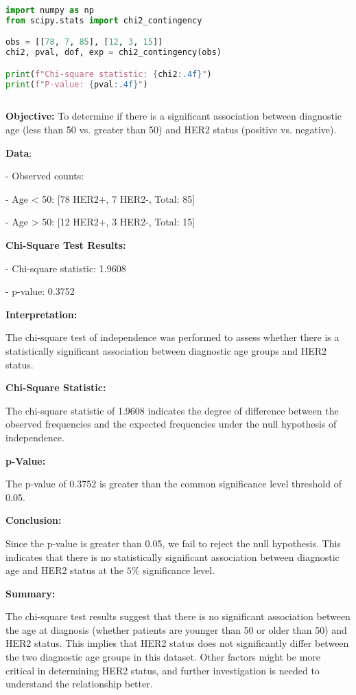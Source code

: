 \documentclass[12 px]{article}
\begin{document}
\begin{lstlisting}[language=Python, breaklines=true]
import numpy as np
from scipy.stats import chi2_contingency

obs = [[78, 7, 85], [12, 3, 15]]
chi2, pval, dof, exp = chi2_contingency(obs)

print(f"Chi-square statistic: {chi2:.4f}")
print(f"P-value: {pval:.4f}")
      
\end{lstlisting}

\textbf{Objective:} To determine if there is a significant association between diagnostic age 
(less than 50 vs. greater than 50) and HER2 status (positive vs. negative).
          
\textbf{Data}:

- Observed counts:

  - Age < 50: [78 HER2+, 7 HER2-, Total: 85]
  
  - Age > 50: [12 HER2+, 3 HER2-, Total: 15]
  

\textbf{Chi-Square Test Results:}

- Chi-square statistic: 1.9608

- p-value: 0.3752

\textbf{Interpretation:}

The chi-square test of independence was performed to assess whether there is a statistically 
significant association between diagnostic age groups and HER2 status.


\textbf{Chi-Square Statistic:}

The chi-square statistic of 1.9608 indicates the degree of difference between the observed frequencies and the expected frequencies under the null hypothesis of independence.

\textbf{p-Value:}
 
The p-value of 0.3752 is greater than the common significance level threshold of 0.05.


\textbf{Conclusion:}

Since the p-value is greater than 0.05, we fail to reject the null hypothesis.
            This indicates that there is no statistically significant association between
            diagnostic age and HER2 status at the $5\%$ significance level.
            
\textbf{Summary:}

The chi-square test results suggest that there is no significant association 
between the age at diagnosis (whether patients are younger than 50 or older than 50) 
and HER2 status. This implies that HER2 status does not significantly differ between
the two diagnostic age groups in this dataset. Other factors might be more critical
in determining HER2 status, and further investigation is needed to understand the
relationship better.
\end{document}
